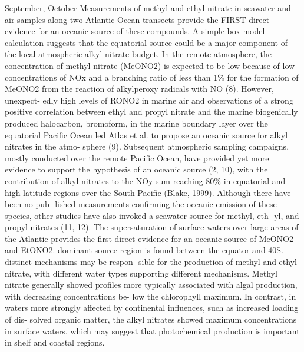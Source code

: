\documentclass[11pt,a4paper]{article}
\begin{document}
\citep{Chuck2002} September, October
Measurements of methyl and ethyl nitrate in seawater and air samples along two Atlantic Ocean transects provide the FIRST direct evidence for an oceanic source of these compounds. A simple box model calculation suggests that the equatorial source could be a major component of the local atmospheric alkyl nitrate budget.
In the remote atmosphere, the concentration of methyl nitrate (MeONO2) is expected to be low because of low concentrations of NOx and a branching ratio of less than 1\% for the formation of MeONO2
from the reaction of alkylperoxy radicals with NO (8). However, unexpect- edly high levels of RONO2 in marine air and observations of a strong positive correlation between ethyl and propyl nitrate and the marine biogenically produced halocarbon, bromoform, in the marine boundary layer over the equatorial Pacific Ocean led Atlas et al. to propose an oceanic source for alkyl nitrates in the atmo- sphere (9). Subsequent atmospheric sampling campaigns, mostly conducted over the remote Pacific Ocean, have provided yet more evidence to support the hypothesis of an oceanic source (2, 10), with the contribution of alkyl nitrates to the NOy
sum reaching 80\% in equatorial and high-latitude regions over the South Pacific (Blake, 1999). Although there have been no pub- lished measurements confirming the oceanic emission of these species, other studies have also invoked a seawater source for methyl, eth- yl, and propyl nitrates (11, 12). The supersaturation of surface waters over large areas of the Atlantic provides the first direct evidence for an oceanic source of MeONO2 and EtONO2. dominant source region is found between the equator and 40S. distinct mechanisms may be respon- sible for the production of methyl and ethyl nitrate, with different water types supporting different mechanisms. Methyl nitrate generally showed profiles more typically associated with algal production, with decreasing concentrations be- low the chlorophyll maximum. In contrast, in waters more strongly affected by continental influences, such as increased loading of dis- solved organic matter, the alkyl nitrates showed maximum concentrations in surface waters, which may suggest that photochemical production is important in shelf and coastal regions.
\end{document}
